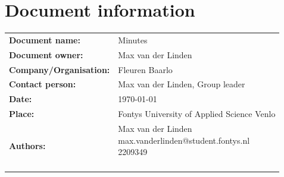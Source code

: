 \documentclass[12pt]{article}
\begin{document}

\clearpage

\section*{Document information}
\begin{tabular}{ll}
	\textbf{Document name:} & Minutes\\
	\textbf{Document owner:} & Max van der Linden \\
	\textbf{Company/Organisation:} & Fleuren Baarlo \\
	\textbf{Contact person:} & Max van der Linden, Group leader \\
	\textbf{Date:} & \today \\
	\textbf{Place:} & Fontys University of Applied Science Venlo \\
	\textbf{Authors:} & \parbox[t]{5cm}{
		Max van der Linden\\ max.vanderlinden@student.fontys.nl\\ 2209349 \\ \\}
\end{tabular}
\end{document}
